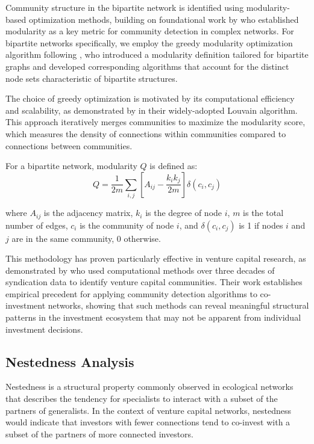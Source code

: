 Community structure in the bipartite network is identified using modularity-based optimization methods, building on foundational work by \cite{Newman2006} who established modularity as a key metric for community detection in complex networks. For bipartite networks specifically, we employ the greedy modularity optimization algorithm following \cite{Barber2007}, who introduced a modularity definition tailored for bipartite graphs and developed corresponding algorithms that account for the distinct node sets characteristic of bipartite structures.

The choice of greedy optimization is motivated by its computational efficiency and scalability, as demonstrated by \cite{Blondel2008} in their widely-adopted Louvain algorithm. This approach iteratively merges communities to maximize the modularity score, which measures the density of connections within communities compared to connections between communities.

For a bipartite network, modularity $Q$ is defined as:
\begin{equation}
Q = \frac{1}{2m} \sum_{i,j} \left[ A_{ij} - \frac{k_i k_j}{2m} \right] \delta(c_i, c_j)
\end{equation}

where $A_{ij}$ is the adjacency matrix, $k_i$ is the degree of node $i$, $m$ is the total number of edges, $c_i$ is the community of node $i$, and $\delta(c_i, c_j)$ is 1 if nodes $i$ and $j$ are in the same community, 0 otherwise.

This methodology has proven particularly effective in venture capital research, as demonstrated by \cite{Bubna2020} who used computational methods over three decades of syndication data to identify venture capital communities. Their work establishes empirical precedent for applying community detection algorithms to co-investment networks, showing that such methods can reveal meaningful structural patterns in the investment ecosystem that may not be apparent from individual investment decisions.

\subsection{Nestedness Analysis}

Nestedness is a structural property commonly observed in ecological networks \cite{AlmeidaNeto2008} that describes the tendency for specialists to interact with a subset of the partners of generalists. In the context of venture capital networks, nestedness would indicate that investors with fewer connections tend to co-invest with a subset of the partners of more connected investors.


